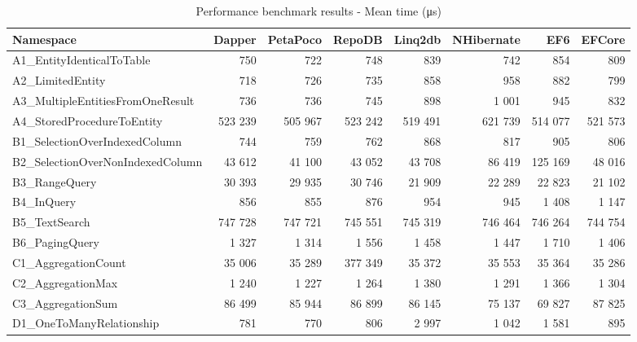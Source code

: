 \clearpage
\begin{landscape}
\begin{table}
\centering
\caption{Performance benchmark results - Mean time (\unit{\micro\second})}
\label{tab:benchmark_results_time}
\begin{tabular}{lrrrrrrr}
\toprule
Namespace &    Dapper &  PetaPoco &    RepoDB &   Linq2db &  NHibernate &        EF6 &     EFCore \\
\midrule
A1\_EntityIdenticalToTable        &      750 &      722 &      748 &      839 &        742 &        854 &        809 \\
A2\_LimitedEntity                 &      718 &      726 &      735 &      858 &        958 &        882 &        799 \\
A3\_MultipleEntitiesFromOneResult &      736 &      736 &      745 &      898 &      1 001 &        945 &        832 \\
A4\_StoredProcedureToEntity       &  523 239 &  505 967 &  523 242 &  519 491 &    621 739 &    514 077 &    521 573 \\
B1\_SelectionOverIndexedColumn    &      744 &      759 &      762 &      868 &        817 &        905 &        806 \\
B2\_SelectionOverNonIndexedColumn &   43 612 &   41 100 &   43 052 &   43 708 &     86 419 &    125 169 &     48 016 \\
B3\_RangeQuery                    &   30 393 &   29 935 &   30 746 &   21 909 &     22 289 &     22 823 &     21 102 \\
B4\_InQuery                       &      856 &      855 &      876 &      954 &        945 &      1 408 &      1 147 \\
B5\_TextSearch                    &  747 728 &  747 721 &  745 551 &  745 319 &    746 464 &    746 264 &    744 754 \\
B6\_PagingQuery                   &    1 327 &    1 314 &    1 556 &    1 458 &      1 447 &      1 710 &      1 406 \\
C1\_AggregationCount              &   35 006 &   35 289 &  377 349 &   35 372 &     35 553 &     35 364 &     35 286 \\
C2\_AggregationMax                &    1 240 &    1 227 &    1 264 &    1 380 &      1 291 &      1 366 &      1 304 \\
C3\_AggregationSum                &   86 499 &   85 944 &   86 899 &   86 145 &     75 137 &     69 827 &     87 825 \\
D1\_OneToManyRelationship         &      781 &      770 &      806 &    2 997 &      1 042 &      1 581 &        895 \\

\end{tabular}
\end{table}
\end{landscape}
